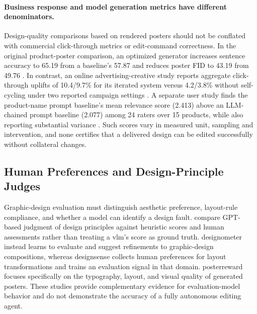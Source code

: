 \paragraph{Business response and model generation metrics have different denominators.}
Design-quality comparisons based on rendered posters should not be conflated with commercial click-through metrics or edit-command correctness.
In the original product-poster comparison, an optimized generator increases sentence accuracy to 65.19 from a baseline's 57.87 and reduces poster FID to 43.19 from 49.76 \citep{autopp2025}.
In contrast, an online advertising-creative study reports aggregate click-through uplifts of 10.4/9.7\% for its iterated system versus 4.2/3.8\% without self-cycling under two reported campaign settings \citep{cg4ctr2024}.
A separate user study finds the product-name prompt baseline's mean relevance score (2.413) above an LLM-chained prompt baseline (2.077) among 24 raters over 15 products, while also reporting substantial variance \citep{ecommercebanners2024}.
Such scores vary in measured unit, sampling and intervention, and none certifies that a delivered design can be edited successfully without collateral changes.

\subsection{Human Preferences and Design-Principle Judges}
Graphic-design evaluation must distinguish aesthetic preference, layout-rule compliance, and whether a model can identify a design fault.
\citet{haraguchi2024gptdesign} compare GPT-based judgment of design principles against heuristic scores and human assessments rather than treating a \ac{vlm}'s score as ground truth.
\ac{designometer} instead learns to evaluate and suggest refinements to graphic-design compositions, whereas \ac{designsense} collects human preferences for layout transformations and trains an evaluation signal in that domain.
\ac{posterreward} focuses specifically on the typography, layout, and visual quality of generated posters.
These studies provide complementary evidence for evaluation-model behavior and do not demonstrate the accuracy of a fully autonomous editing agent.
